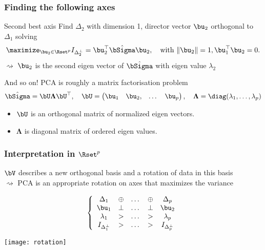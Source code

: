 \begin{frame}
  \frametitle{Finding the following axes}

  \begin{block}{Second best axis}
    Find $\Delta_2$ with dimension 1, director vector $\bu_2$ orthogonal to $\Delta_1$ solving
    \begin{equation*}
        \maximize_{\bu_2 \in \Rset^p} I_{\Delta_2^\bot} = \bu_2^\top \hat{\bSigma}\bu_2, \quad \text{with } \|\bu_2\| = 1, \bu_1^\top \bu_2 = 0.
    \end{equation*} 
  $\rightsquigarrow$ $\bu_2$ is the second eigen vector of $\hat\bSigma$ with eigen value $\lambda_2$
  \end{block}
  
  \vfill
  \pause
  
  \begin{block}{And so on!}
    PCA is roughly a matrix factorisation problem 
    \begin{equation*}
      \hat\bSigma = \bU \boldsymbol\Lambda \bU^\top, \quad
      \bU = \begin{pmatrix}
      \bu_1 & \bu_2, & \dots & \bu_p
      \end{pmatrix}, \quad \boldsymbol\Lambda = \diag(\lambda_1, \dots, \lambda_p)
    \end{equation*}
    \hspace{-.5cm}
  \begin{itemize}
    \item $\bU$ is an orthogonal matrix of normalized eigen vectors.
    \item $\boldsymbol\Lambda$ is diagonal matrix of  ordered eigen values.
  \end{itemize}
  \end{block}
\end{frame}

\begin{frame}
  \frametitle{Interpretation in $\Rset^p$}
    
  $\bV$ describes a new orthogonal basis and a rotation of data in this basis\\
  $\rightsquigarrow$ PCA is an appropriate rotation on axes that maximizes the variance

  \begin{equation*}
    \left\{\begin{array}{ccccc}
      \Delta_1 & \oplus & \dots & \oplus & \Delta_p \\
      \bu_1 & \bot & \dots & \bot & \bu_2 \\
      \lambda_1 & > & \dots & > & \lambda_p \\
      I_{\Delta_1^\bot} & > & \dots & > & I_{\Delta_p^\bot} \\
    \end{array}\right.
  \end{equation*}

  \texttt{[image: rotation]}
\end{frame}
